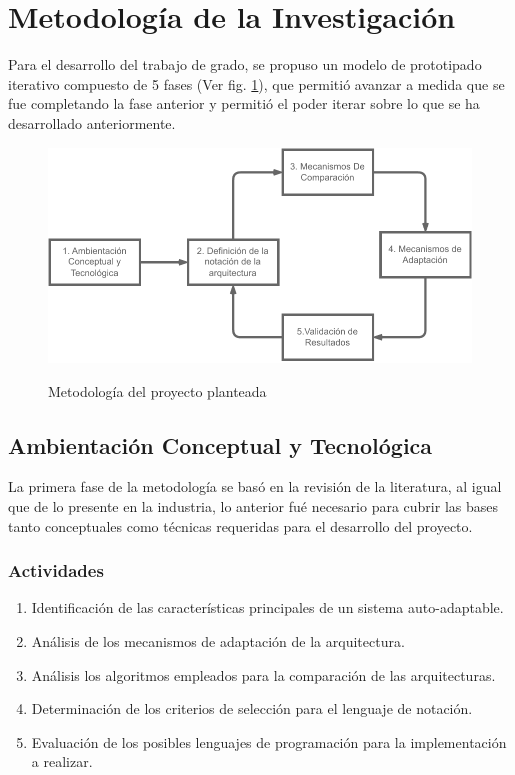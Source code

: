 \section{Metodología de la Investigación}

Para el desarrollo del trabajo de grado, se propuso un modelo de prototipado iterativo compuesto de 5 fases (Ver fig. \ref{fig:met}), que permitió avanzar a medida que se fue completando la fase anterior y permitió el poder iterar sobre lo que se ha desarrollado anteriormente.

\begin{figure}[H]
    \centering
    \caption{Metodología del proyecto planteada}
    \includegraphics[width=0.8\linewidth]{images/Metodologia.pdf}
    \label{fig:met}
\end{figure}

\subsection{Ambientación Conceptual y Tecnológica}

La primera fase de la metodología se basó en la revisión de la literatura, al igual que de lo presente en la industria, lo anterior fué necesario para cubrir las bases tanto conceptuales como técnicas requeridas para el desarrollo del proyecto. 

\subsubsection*{Actividades}

\begin{enumerate}
    \itemsep-2mm
    \item Identificación de las características principales de un sistema auto-adaptable.
    \item Análisis de los mecanismos de adaptación de la arquitectura.
    \item Análisis los algoritmos empleados para la comparación de las arquitecturas.
    \item Determinación de los criterios de selección para el lenguaje de notación.
    \item Evaluación de los posibles lenguajes de programación para la implementación a realizar.
\end{enumerate} 

